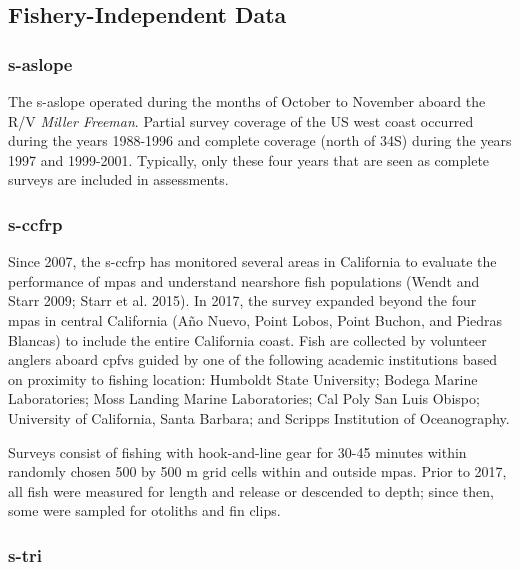 \documentclass[11pt,
  english,
  letterpaper,
]{article}
\begin{document}
\hypertarget{fishery-independent-data}{%
\subsection{Fishery-Independent Data}\label{fishery-independent-data}}

\hypertarget{section}{%
\subsubsection{\texorpdfstring{\acrlong{s-aslope}}{}}\label{section}}

The \gls{s-aslope} operated during the months of October to November aboard the R/V \emph{Miller Freeman}. Partial survey coverage of the US west coast occurred during the years 1988-1996 and complete coverage (north of 34\textquotesingle S) during the years 1997 and 1999-2001. Typically, only these four years that are seen as complete surveys are included in assessments.

\hypertarget{section-1}{%
\subsubsection{\texorpdfstring{\acrlong{s-ccfrp}}{}}\label{section-1}}

Since 2007, the \gls{s-ccfrp} has monitored several areas in California to evaluate the performance of \glspl{mpa} and understand nearshore fish populations (Wendt and Starr 2009; Starr et al. 2015). In 2017, the survey expanded beyond the four \Gls{mpa}s in central California (Año Nuevo, Point Lobos, Point Buchon, and Piedras Blancas) to include the entire California coast. Fish are collected by volunteer anglers aboard \glspl{cpfv} guided by one of the following academic institutions based on proximity to fishing location: Humboldt State University; Bodega Marine Laboratories; Moss Landing Marine Laboratories; Cal Poly San Luis Obispo; University of California, Santa Barbara; and Scripps Institution of Oceanography.

Surveys consist of fishing with hook-and-line gear for 30-45 minutes within randomly chosen 500 by 500 m grid cells within and outside \glspl{mpa}. Prior to 2017, all fish were measured for length and release or descended to depth; since then, some were sampled for otoliths and fin clips.

\hypertarget{section-2}{%
\subsubsection{\texorpdfstring{\acrlong{s-tri}}{}}\label{section-2}}
\end{document}

